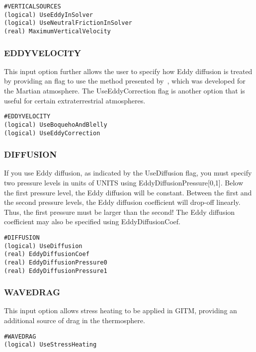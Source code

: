 \begin{verbatim}
#VERTICALSOURCES
(logical) UseEddyInSolver             
(logical) UseNeutralFrictionInSolver  
(real) MaximumVerticalVelocity    
\end{verbatim}

\subsubsection{EDDYVELOCITY}
\label{eddyvelocity.sec}

This input option further allows the user to specify how Eddy diffusion is treated by providing an flag to use the method presented by~\citet{Boqueho:2005aa}, which was developed for the Martian atmosphere.  The UseEddyCorrection flag is another option that is useful for certain extraterrestrial atmospheres.

\begin{verbatim}
#EDDYVELOCITY
(logical) UseBoquehoAndBlelly 
(logical) UseEddyCorrection
\end{verbatim}

\subsubsection{DIFFUSION}
\label{diffusion.sec}

If you use Eddy diffusion, as indicated by the UseDiffusion flag, you must specify two pressure levels in units of UNITS using EddyDiffusionPressure[0,1].  Below the first pressure level, the Eddy diffusion will be constant.  Between the first and the second pressure levels, the Eddy diffusion coefficient will drop-off linearly.  Thus, the first pressure must be larger than the second!  The Eddy diffusion coefficient may also be specified using EddyDiffusionCoef.

\begin{verbatim}
#DIFFUSION
(logical) UseDiffusion
(real) EddyDiffusionCoef
(real) EddyDiffusionPressure0 
(real) EddyDiffusionPressure1
\end{verbatim}

\subsubsection{WAVEDRAG}
\label{wavedrag.sec}

This input option allows stress heating to be applied in GITM, providing an additional source of drag in the thermosphere.

\begin{verbatim}
#WAVEDRAG
(logical) UseStressHeating
\end{verbatim}

